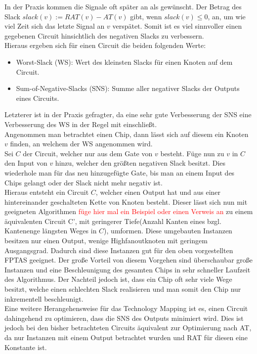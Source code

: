 \documentclass[11pt, a4paper, german]{article}
\newcommand{\TM}{Technology  Mapping }
\begin{document}
In der Praxis kommen die Signale oft später an als gewünscht. Der Betrag des Slack $slack(v) := RAT(v) - AT(v)$ gibt, wenn $slack(v) \leq 0 $, an, um wie viel Zeit sich das letzte Signal an $v$ verspätet. Somit ist es viel sinnvoller einen gegebenen Circuit hinsichtlich des negativen Slacks zu verbessern. \\
Hieraus ergeben sich für einen Circuit die beiden folgenden Werte: 
\begin{itemize}
	\item Worst-Slack (WS): Wert des kleinsten Slacks für einen Knoten auf dem Circuit.
	\item Sum-of-Negative-Slacks (SNS): Summe aller negativer Slacks der Outputs eines Circuits.
\end{itemize}
Letzterer ist in der Praxis gefragter, da eine sehr gute Verbesserung der SNS eine Verbesserung des WS in der Regel mit einschließt. \\

Angenommen man betrachtet einen Chip, dann lässt sich auf diesem ein Knoten $v$ finden, an welchem der WS angenommen wird.\\
Sei $C$ der Circuit, welcher nur aus dem Gate von $v$ besteht. Füge nun zu $v$ in $C$ den Input von $v$ hinzu, welcher den größten negativen Slack besitzt. Dies wiederhole man für das neu hinzugefügte Gate, bis man an einem Input des Chips gelangt oder der Slack nicht mehr negativ ist. \\
Hieraus entsteht ein Circuit $C$, welcher einen Output hat und aus einer hintereinander geschalteten Kette von Knoten besteht. Dieser lässt sich nun mit geeigneten Algorithmen \textcolor{red}{füge hier mal ein Beispiel oder einen Verweis an} zu einem äquivalenten Circuit C', mit geringerer Tiefe(Anzahl Kanten eines bzgl. Kantenenge längsten  Weges in $C$), umformen. Diese umgebauten Instanzen besitzen nur einen Output, wenige Highfanoutknoten mit geringem Ausgangsgrad. Dadurch sind diese Instanzen gut für den oben vorgestellten FPTAS geeignet. Der große Vorteil von diesem Vorgehen sind überschaubar große Instanzen und eine Beschleunigung des gesamten Chips in sehr schneller Laufzeit des Algorithmus. Der Nachteil jedoch ist, dass ein Chip oft sehr viele Wege besitzt, welche einen schlechten Slack realisieren und man somit den Chip nur inkrementell beschleunigt.\\

Eine weitere Herangehensweise für das \TM ist es, einen Circuit dahingehend zu optimieren, dass die SNS des Outputs minimiert wird. Dies ist jedoch bei den bisher betrachteten Circuits äquivalent zur Optimierung nach AT, da nur Instanzen mit einem Output betrachtet wurden und RAT für diesen eine Konstante ist.
\end{document}
